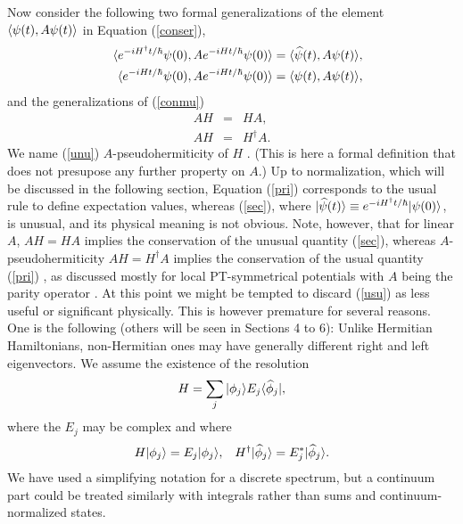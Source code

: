 %
%
%
%
Now consider the following two formal generalizations of the element \linebreak $\langle \psi(t),A\psi(t)\rangle$ in Equation (\ref{conser}),
%
\begin{eqnarray}
&&\la e^{-iH^\dagger t/\hbar} \psi(0), A e^{-iHt/\hbar} \psi(0)\ra=\la \widehat{\psi}(t),A\psi(t)\ra,
\label{sec}
\\
%
&&\la e^{-iH t/\hbar}  \psi(0), A e^{-iHt/\hbar} \psi(0)\ra=\la \psi(t), A \psi(t)\ra,
\label{pri}
\end{eqnarray}
%
and the  generalizations of (\ref{conmu})
%
\begin{eqnarray}
AH&=&HA,
\label{usu}
\\
AH&=&H^\dagger A.
\label{unu}
\end{eqnarray}
%
We name (\ref{unu}) $A$-pseudohermiticity of $H$ \cite{Mostafazadeh2010}.
(This is here a formal definition that does not presupose any  further property
on $A$.)
Up  to normalization, which will be discussed in the following section, Equation (\ref{pri}) corresponds to the
usual rule to
define expectation values, whereas (\ref{sec}), where $|\widehat{\psi}(t)\rangle\equiv e^{-iH^\dagger t/\hbar} |\psi(0)\rangle$,
is unusual, and its physical meaning is not obvious. Note, however, that for linear $A$,
$AH=HA$ implies the conservation of the unusual quantity (\ref{sec}), whereas
$A$-pseudohermiticity $AH=H^\dagger A$ implies the conservation of the usual quantity (\ref{pri}) \cite{Mostafazadeh2002,Vitanov2016},
as discussed mostly for local PT-symmetrical potentials with $A$ being the parity operator \cite{Bagchi2001,Zezyulin2013,Konotop2016}.
At this point we might be tempted to discard (\ref{usu}) as less useful or significant physically.
This is however premature for several reasons. One is the following (others will be seen in Sections 4 to 6):
Unlike Hermitian Hamiltonians, non-Hermitian ones may have generally different
right and left eigenvectors. We assume the existence of the resolution
%
\begin{equation}
H=\sum_j |\phi_j\ra E_j \la\widehat{\phi}_j|,
\label{res}
\end{equation}
%
where the $E_j$ may be complex and where
%
\begin{eqnarray}
H|\phi_j\rangle=E_j|\phi_j\rangle, \;\;\;
H^\dagger|\widehat{\phi}_j\rangle=E_j^* |\widehat{\phi}_j\rangle.
\end{eqnarray}
%
We have used a simplifying notation for  a discrete spectrum, but a continuum
part could be treated similarly with integrals rather than sums and continuum-normalized states.
